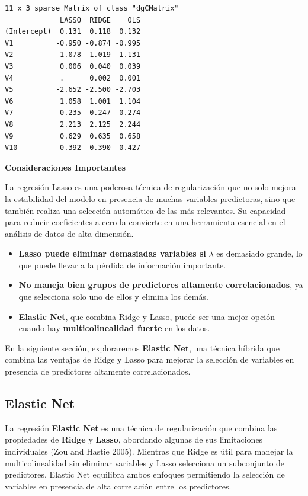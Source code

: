 \documentclass[
  letterpaper,
  DIV=11,
  numbers=noendperiod]{scrreprt}
\providecommand{\tightlist}{%
  \setlength{\itemsep}{0pt}\setlength{\parskip}{0pt}}
\begin{document}
\begin{tcolorbox}
\begin{verbatim}
11 x 3 sparse Matrix of class "dgCMatrix"
             LASSO  RIDGE    OLS
(Intercept)  0.131  0.118  0.132
V1          -0.950 -0.874 -0.995
V2          -1.078 -1.019 -1.131
V3           0.006  0.040  0.039
V4           .      0.002  0.001
V5          -2.652 -2.500 -2.703
V6           1.058  1.001  1.104
V7           0.235  0.247  0.274
V8           2.213  2.125  2.244
V9           0.629  0.635  0.658
V10         -0.392 -0.390 -0.427
\end{verbatim}

\end{tcolorbox}

\textbf{Consideraciones Importantes}

La regresión Lasso es una poderosa técnica de regularización que no solo
mejora la estabilidad del modelo en presencia de muchas variables
predictoras, sino que también realiza una selección automática de las
más relevantes. Su capacidad para reducir coeficientes a cero la
convierte en una herramienta esencial en el análisis de datos de alta
dimensión.

\begin{itemize}
\tightlist
\item
  \textbf{Lasso puede eliminar demasiadas variables si} \(\lambda\) es
  demasiado grande, lo que puede llevar a la pérdida de información
  importante.
\item
  \textbf{No maneja bien grupos de predictores altamente
  correlacionados}, ya que selecciona solo uno de ellos y elimina los
  demás.
\item
  \textbf{Elastic Net}, que combina Ridge y Lasso, puede ser una mejor
  opción cuando hay \textbf{multicolinealidad fuerte} en los datos.
\end{itemize}

En la siguiente sección, exploraremos \textbf{Elastic Net}, una técnica
híbrida que combina las ventajas de Ridge y Lasso para mejorar la
selección de variables en presencia de predictores altamente
correlacionados.

\subsection{Elastic Net}\label{elastic-net}

La regresión \textbf{Elastic Net} es una técnica de regularización que
combina las propiedades de \textbf{Ridge} y \textbf{Lasso}, abordando
algunas de sus limitaciones individuales (Zou and Hastie 2005). Mientras
que Ridge es útil para manejar la multicolinealidad sin eliminar
variables y Lasso selecciona un subconjunto de predictores, Elastic Net
equilibra ambos enfoques permitiendo la selección de variables en
presencia de alta correlación entre los predictores.
\end{document}
